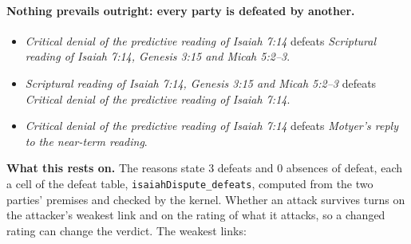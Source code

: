 \documentclass[11pt]{article}
\begin{document}
\paragraph{Nothing prevails outright: every party is defeated by another.}
\begin{itemize}
\item \emph{Critical denial of the predictive reading of Isaiah 7:14} defeats \emph{Scriptural reading of Isaiah 7:14, Genesis 3:15 and Micah 5:2–3}.
\item \emph{Scriptural reading of Isaiah 7:14, Genesis 3:15 and Micah 5:2–3} defeats \emph{Critical denial of the predictive reading of Isaiah 7:14}.
\item \emph{Critical denial of the predictive reading of Isaiah 7:14} defeats \emph{Motyer’s reply to the near-term reading}.
\end{itemize}
\par\noindent\textbf{What this rests on.} The reasons state 3 defeats and 0 absences of defeat, each a cell of the defeat table, \texttt{isaiah\allowbreak{}Dispute\_\allowbreak{}defeats}, computed from the two parties' premises and checked by the kernel. Whether an attack survives turns on the attacker's weakest link and on the rating of what it attacks, so a changed rating can change the verdict. The weakest links:
\end{document}
